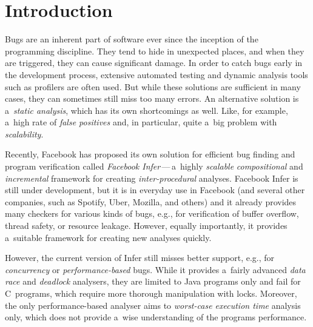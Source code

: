 \documentclass{ExcelAtFIT}
\affiliation{
    \{%
    *\href{mailto:xharmi00@stud.fit.vutbr.cz}{xharmi00},
    **\href{mailto:xmarci10@stud.fit.vutbr.cz}{xmarci10},
    ***\href{mailto:xpavel34@stud.fit.vutbr.cz}{xpavel34}%
    \}@stud.fit.vutbr.cz,
    \emph{%
        Faculty of Information Technology, Brno University
        of Technology%
    }
}
\begin{document}
\startdocument


\section{Introduction}
Bugs are an inherent part of software ever since
the inception of the programming discipline.
They tend to hide in unexpected places, and when
they are triggered, they can cause significant
damage. In order to catch bugs early in the
development process, extensive automated testing
and dynamic analysis tools such as profilers are
often used. But while these solutions are sufficient
in many cases, they can sometimes still miss too
many errors. An alternative solution is a~\emph{static
analysis}, which has its own shortcomings as well.
Like, for example, a~high rate of \emph{false positives}
and, in particular, quite a~big problem with
\emph{scalability}.

Recently, Facebook has proposed its own solution
for efficient bug finding and program verification
called \emph{Facebook Infer}\,---\,a~highly
\emph{scalable} \emph{compositional} and
\emph{incremental} framework for creating
\emph{inter-procedural} analyses. Facebook Infer is still
under development, but it is in everyday use in
Facebook (and several other companies, such as
Spotify, Uber, Mozilla, and others) and it already
provides many checkers for various kinds of bugs,
e.g., for verification of buffer overflow, thread
safety, or resource leakage. However, equally
importantly, it provides a~suitable framework
for creating new analyses quickly.

However, the current version of Infer still misses
better support, e.g., for \emph{concurrency} or
\emph{performance-based} bugs. While it provides a~fairly
advanced \emph{data race} and \emph{deadlock} analysers,
they are limited to Java programs only and fail for
C~programs, which require more thorough manipulation with
locks. Moreover, the only performance-based analyser aims
to \emph{worst-case execution time} analysis only,
which does not provide a~wise understanding of
the programs performance.
\end{document}
